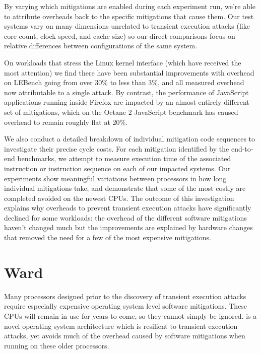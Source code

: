 By varying which mitigations are enabled during each experiment run, we're able to attribute overheads back to the specific mitigations that cause them.
Our test systems vary on many dimensions unrelated to transient execution attacks (like core count, clock speed, and cache size) so our direct comparisons focus on relative differences between configurations of the same system.

On workloads that stress the Linux kernel interface (which have received the most attention) we find there have been substantial improvements with overhead on LEBench going from over 30\% to less than 3\%, and all measured overhead now attributable to a single attack.
By contrast, the performance of JavaScript applications running inside Firefox are impacted by an almost entirely different set of mitigations, which on the Octane 2 JavaScript benchmark has caused overhead to remain roughly flat at 20\%.

We also conduct a detailed breakdown of individual mitigation code sequences to investigate their precise cycle costs.
For each mitigation identified by the end-to-end benchmarks, we attempt to measure execution time of the associated instruction or instruction sequence on each of our impacted systems.
Our experiments show meaningful variations between processors in how long individual mitigations take, and demonstrate that some of the most costly are completed avoided on the newest CPUs. 
The outcome of this investigation explains why overheads to prevent transient execution attacks have significantly declined for some workloads: the overhead of the different software mitigations haven't changed much but the improvements are explained by hardware changes that removed the need for a few of the most expensive mitigations.

\section{Ward}
Many processors designed prior to the discovery of transient execution attacks require especially expensive operating system level software mitigations.
These CPUs will remain in use for years to come, so they cannot simply be ignored.
\sys is a novel operating system architecture which is resilient to transient execution attacks, yet avoids much of the overhead caused by software mitigations when running on these older processors.

